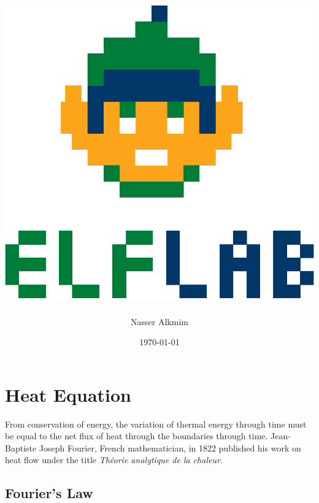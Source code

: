 \documentclass[10pt, a4paper]{article}
\begin{document}
\title {
\includegraphics[scale=.3]{fig/logo7.eps} \\
}
\author{Nasser Alkmim}
\date{ {\footnotesize\today}}
\maketitle

\begin{abstract}

\end{abstract}

\tableofcontents

\thispagestyle{empty}
\clearpage
\pagestyle{fancy}


\section{Heat Equation}

From conservation of energy, the variation of thermal energy through time must be equal to the net flux of heat through the boundaries through time. Jean-Baptiste Joseph Fourier, French mathematician, in 1822 published his work on heat flow under the title \emph{Théorie analytique de la chaleur}.

\subsection{Fourier's Law}
\end{document}

